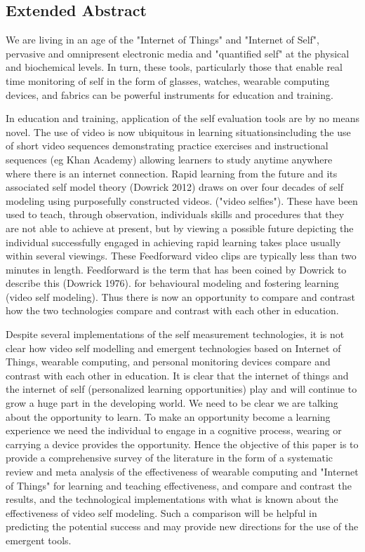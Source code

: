 \subsection{Extended Abstract}


We are living in an age of the "Internet of Things" and "Internet of Self", pervasive and omnipresent electronic media and "quantified self" at the physical and biochemical levels. In turn, these tools, particularly those that enable real time monitoring of self in the form of glasses, watches, wearable computing devices, and fabrics can be powerful instruments for education and training. 

In education and training, application of the self evaluation tools are by no means novel. The use of video is now ubiquitous in learning situationsincluding the use of short video sequences demonstrating practice exercises and instructional sequences (eg Khan Academy) allowing learners to study anytime anywhere where there is an internet connection.  Rapid learning from the future and its associated self model theory (Dowrick 2012) draws on over four decades of  self modeling using purposefully constructed videos. ("video selfies"). These have been used to teach, through observation, individuals skills and procedures that they are not able to achieve at present, but by viewing a possible future depicting the individual successfully engaged in achieving rapid learning takes place usually within several viewings. These Feedforward video clips are typically less than two minutes in length. Feedforward is the term that has been coined by Dowrick to describe this (Dowrick 1976). for behavioural modeling and fostering learning (video self modeling). Thus there is now an opportunity to compare and contrast how the two technologies compare and contrast with each other in education. 

Despite several implementations of the self measurement technologies, it is not clear how video self modelling and emergent technologies based on Internet of Things, wearable computing, and personal monitoring devices compare and contrast with each other in education. It is clear that the internet of things and the internet of self (personalized learning opportunities) play and will continue to grow a huge part in the developing world.  We need to be clear we are talking about the opportunity to learn. To make an opportunity become a learning experience we need the individual to engage in a cognitive process, wearing or carrying a device provides the opportunity.   Hence the objective of this paper is to provide a comprehensive survey of the literature in the form of a systematic review and meta analysis of the effectiveness of wearable computing and "Internet of Things" for learning and teaching effectiveness, and compare and contrast the results, and the technological implementations with what is known about the effectiveness of video self modeling. Such a comparison will be helpful in predicting the potential success and may provide new directions for the use of the emergent tools.

